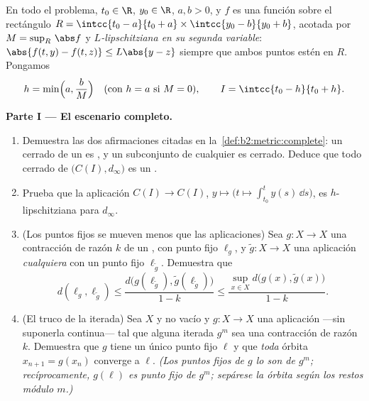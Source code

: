 \begin{problem}
\label{pb:b2:metric:1}
En todo el problema, $t_0 \in \R$, $y_0 \in \R$, $a, b > 0$, y $f$
es una función  sobre el rectángulo $R = \intcc{t_0 - a}{t_0
+ a} \times \intcc{y_0 - b}{y_0 + b}$, acotada por $M = \sup_R\,\abs
f$ y \emph{$L$-lipschitziana en su segunda variable}: $\abs{f(t, y)
- f(t, z)} \leq L\abs{y - z}$ siempre que ambos puntos estén en $R$.
Pongamos
\[
h = \min\Bigl(a, \frac bM\Bigr) \quad (\text{con } h = a
\text{ si } M = 0), \qquad I = \intcc{t_0 - h}{t_0 + h}.
\]

\medskip
\noindent\textbf{Parte I --- El escenario completo.}
\begin{enumerate}
  \item Demuestra las dos afirmaciones citadas en la~\cref{def:b2:metric:complete}: un cerrado de un
         es , y un subconjunto
         de cualquier  es cerrado. Deduce
        que todo cerrado de $\bigl(C(I), d_\infty\bigr)$ es un
        .
  \item Prueba que la aplicación $C(I) \to C(I)$, $y \mapsto
        \bigl(t \mapsto \int_{t_0}^{t}y(s)\,\dd s\bigr)$, es
        $h$-lipschitziana para $d_\infty$.
  \item (Los puntos fijos se mueven menos que las aplicaciones)
        Sea $g \colon X \to X$ una contracción de razón $k$ de un
        , con punto fijo $\ell_g$, y $\widetilde g
        \colon X \to X$ una aplicación \emph{cualquiera} con un
        punto fijo $\ell_{\widetilde g}$. Demuestra que
        \[
        d(\ell_g, \ell_{\widetilde g}) \leq
        \frac{d\bigl(g(\ell_{\widetilde g}),
        \widetilde g(\ell_{\widetilde g})\bigr)}{1 - k}
        \leq \frac{\sup_{x \in X} d\bigl(g(x), \widetilde
        g(x)\bigr)}{1 - k}.
        \]
  \item (El truco de la iterada) Sea $X$  y no vacío y $g
        \colon X \to X$ una aplicación ---sin suponerla
        continua--- tal que alguna iterada $g^m$ sea una
        contracción de razón $k$. Demuestra que $g$ tiene un único
        punto fijo $\ell$ y que \emph{toda} órbita $x_{n+1} =
        g(x_n)$ converge a $\ell$. \emph{(Los puntos fijos de $g$
        lo son de $g^m$; recíprocamente, $g(\ell)$ es punto fijo de
        $g^m$; sepárese la órbita según los restos módulo $m$.)}
\end{enumerate}


\end{problem}
